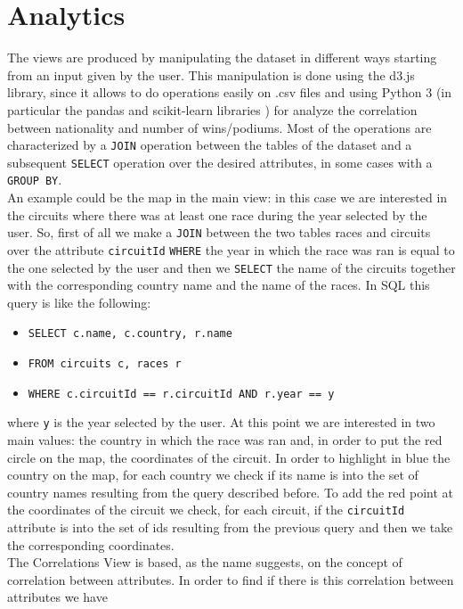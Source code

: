 \documentclass[10pt,twocolumn,letterpaper]{article}
\begin{document}
\section{Analytics}
The views are produced by manipulating the dataset in different ways starting from an input given by the user. This manipulation is done using the d3.js \cite{D3} library,
since it allows to do operations easily on .csv files and using Python 3 (in particular the pandas \cite{Pandas} and scikit-learn libraries \cite{Scikit-learn}) 
for analyze the correlation between nationality and number of wins/podiums. Most of the operations are characterized by a \texttt{JOIN} operation between the tables of the 
dataset and a subsequent \texttt{SELECT} operation over the desired attributes, in some cases with a \texttt{GROUP BY}.\\
An example could be the map in the main view: in this case we are interested in the circuits where there was at least one race during the year selected by the user. So, first
of all we make a \texttt{JOIN} between the two tables races and circuits over the attribute \texttt{circuitId} \texttt{WHERE} the year in which the race was ran is equal to the
one selected by the user and then we \texttt{SELECT} the name of the circuits together with the corresponding country name and the name of the races. In SQL this query is like the
following:
\begin{itemize}
	\item \texttt{SELECT c.name, c.country, r.name}
	\item \texttt{FROM circuits c, races r}
	\item \texttt{WHERE c.circuitId == r.circuitId AND r.year == y}
\end{itemize}
where \texttt{y} is the year selected by the user.
At this point we are interested in two main values: the country in which the race was ran and, in order to put the red circle on the map, the coordinates of the circuit. In order to
highlight in blue the country on the map, for each country we check if its name is into the set of country names resulting from the query described before. To add the red point
at the coordinates of the circuit we check, for each circuit, if the \texttt{circuitId} attribute is into the set of ids resulting from the previous query and then we take the
corresponding coordinates.\\
The Correlations View is based, as the name suggests, on the concept of correlation between attributes. In order to find if there is this correlation between attributes we have
\end{document}
